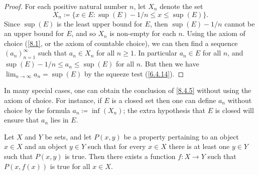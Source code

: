 \begin{proof}
  For each positive natural number \(n\), let \(X_n\) denote the set
  \[
    X_n \coloneqq \{x \in E : \sup(E) - 1 / n \leq x \leq \sup(E)\}.
  \]
  Since \(\sup(E)\) is the least upper bound for \(E\), then \(\sup(E) - 1 / n\) cannot be an upper bound for \(E\), and so \(X_n\) is non-empty for each \(n\).
  Using the axiom of choice (\cref{8.1}, or the axiom of countable choice), we can then find a sequence \((a_n)_{n = 1}^\infty\) such that \(a_n \in X_n\) for all \(n \geq 1\).
  In particular \(a_n \in E\) for all \(n\), and \(\sup(E) - 1 / n \leq a_n \leq \sup(E)\) for all \(n\).
  But then we have \(\lim_{n \to \infty} a_n = \sup(E)\) by the squeeze test (\cref{6.4.14}).
\end{proof}

\begin{rmk}\label{8.4.6}
  In many special cases, one can obtain the conclusion of \cref{8.4.5} without using the axiom of choice.
  For instance, if \(E\) is a closed set then one can define \(a_n\) without choice by the formula \(a_n \coloneqq \inf(X_n)\);
  the extra hypothesis that \(E\) is closed will ensure that \(a_n\) lies in \(E\).
\end{rmk}

\begin{prop}\label{8.4.7}
  Let \(X\) and \(Y\) be sets, and let \(P(x, y)\) be a property pertaining to an object \(x \in X\) and an object \(y \in Y\) such that for every \(x \in X\) there is at least one \(y \in Y\) such that \(P(x, y)\) is true.
  Then there exists a function \(f : X \to Y\) such that \(P(x, f(x))\) is true for all \(x \in X\).
\end{prop}

